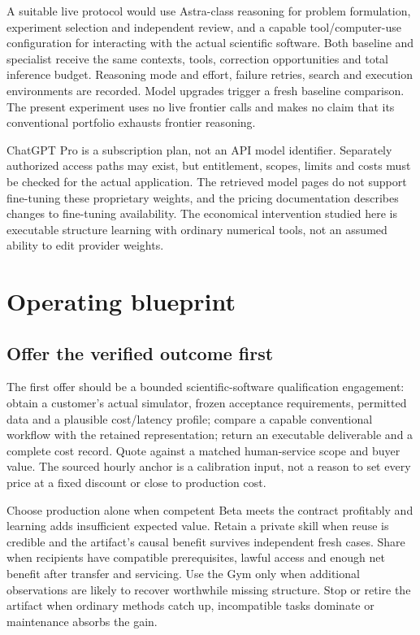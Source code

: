 \documentclass[11pt,letterpaper]{article}
\begin{document}
A suitable live protocol would use Astra-class reasoning for problem formulation, experiment selection and independent review, and a capable tool/computer-use configuration for interacting with the actual scientific software. Both baseline and specialist receive the same contexts, tools, correction opportunities and total inference budget. Reasoning mode and effort, failure retries, search and execution environments are recorded. Model upgrades trigger a fresh baseline comparison. The present experiment uses no live frontier calls and makes no claim that its conventional portfolio exhausts frontier reasoning.

ChatGPT Pro is a subscription plan, not an API model identifier. Separately authorized access paths may exist, but entitlement, scopes, limits and costs must be checked for the actual application. The retrieved model pages do not support fine-tuning these proprietary weights, and the pricing documentation describes changes to fine-tuning availability. The economical intervention studied here is executable structure learning with ordinary numerical tools, not an assumed ability to edit provider weights.

\section{Operating blueprint}

\subsection{Offer the verified outcome first}

The first offer should be a bounded scientific-software qualification engagement: obtain a customer's actual simulator, frozen acceptance requirements, permitted data and a plausible cost/latency profile; compare a capable conventional workflow with the retained representation; return an executable deliverable and a complete cost record. Quote against a matched human-service scope and buyer value. The sourced hourly anchor is a calibration input, not a reason to set every price at a fixed discount or close to production cost.

Choose production alone when competent Beta meets the contract profitably and learning adds insufficient expected value. Retain a private skill when reuse is credible and the artifact's causal benefit survives independent fresh cases. Share when recipients have compatible prerequisites, lawful access and enough net benefit after transfer and servicing. Use the Gym only when additional observations are likely to recover worthwhile missing structure. Stop or retire the artifact when ordinary methods catch up, incompatible tasks dominate or maintenance absorbs the gain.
\end{document}
